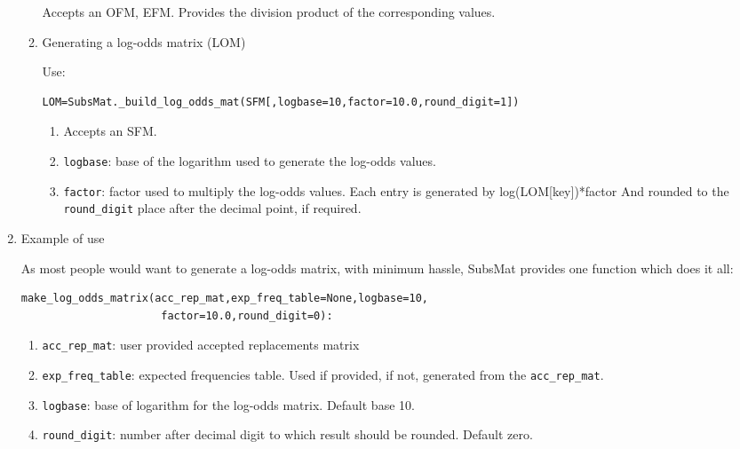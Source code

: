 \documentclass{report}
\begin{document}
\begin{enumerate}
\begin{enumerate}
  Accepts an OFM, EFM. Provides the division product of the corresponding values.

\item Generating a log-odds matrix (LOM)

   Use:
\begin{verbatim}
LOM=SubsMat._build_log_odds_mat(SFM[,logbase=10,factor=10.0,round_digit=1])
\end{verbatim}

   \begin{enumerate}
     \item Accepts an SFM.

     \item \verb|logbase|: base of the logarithm used to generate the log-odds values.

     \item \verb|factor|: factor used to multiply the log-odds values.  Each entry is generated by log(LOM[key])*factor And rounded to the \verb|round_digit| place after the decimal point, if required.

\end{enumerate}

\end{enumerate}

\item Example of use

As most people would want to generate a log-odds matrix, with minimum hassle, SubsMat provides one function which does it all:

\begin{verbatim}
make_log_odds_matrix(acc_rep_mat,exp_freq_table=None,logbase=10,
                      factor=10.0,round_digit=0):
\end{verbatim}

\begin{enumerate}
  \item \verb|acc_rep_mat|: user provided accepted replacements matrix
  \item \verb|exp_freq_table|: expected frequencies table. Used if provided, if not, generated from the \verb|acc_rep_mat|.
  \item \verb|logbase|: base of logarithm for the log-odds matrix. Default base 10.
  \item \verb|round_digit|: number after decimal digit to which result should be rounded. Default zero.
\end{enumerate}

\end{enumerate}
\end{document}
